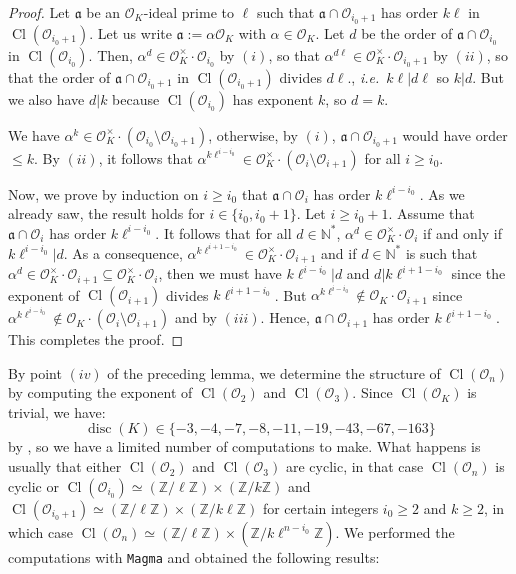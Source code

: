 \documentclass[a4paper,10pt]{report}
\theoremstyle{definition}
\theoremstyle{plain}
\theoremstyle{definition}
\newcommand{\ie}{\emph{i.e.}\ }
\newcommand{\N}{\mathbb{N}}
\newcommand{\Z}{\mathbb{Z}}
\newcommand{\mO}{\mathcal{O}}
\renewcommand{\(}{\left(}
\renewcommand{\)}{\right)}
\newcommand{\mf}[1]{\mathfrak{#1}}
\DeclareMathOperator{\disc}{disc}
\DeclareMathOperator{\Cl}{Cl}
\begin{document}
\begin{proof}
Let $\mf{a}$ be an $\mO_K$-ideal prime to $\ell$ such that $\mf{a}\cap\mO_{i_0+1}$ has order $k\ell$ in $\Cl(\mO_{i_0+1})$.  Let us write $\mf{a}:=\alpha\mO_K$ with $\alpha\in\mO_K$. Let $d$ be the order of $\mf{a}\cap\mO_{i_0}$ in $\Cl(\mO_{i_0})$. Then, $\alpha^{d}\in\mO_K^\times\cdot\mO_{i_0}$ by $(i)$, so that $\alpha^{d\ell}\in\mO_K^\times\cdot\mO_{i_0+1}$ by $(ii)$, so that the order of $\mf{a}\cap\mO_{i_0+1}$ in $\Cl(\mO_{i_0+1})$ divides $d\ell$., \ie $k\ell|d\ell$ so $k|d$. But we also have $d|k$ because $\Cl(\mO_{i_0})$ has exponent $k$, so $d=k$. 

We have $\alpha^k\in\mO_K^\times\cdot(\mO_{i_0}\setminus\mO_{i_0+1})$, otherwise, by $(i)$, $\mf{a}\cap\mO_{i_0+1}$ would have order $\leq k$. By $(ii)$, it follows that $\alpha^{k\ell^{i-i_0}}\in\mO_K^\times\cdot(\mO_{i}\setminus\mO_{i+1})$ for all $i\geq i_0$.

Now, we prove by induction on $i\geq i_0$ that $\mf{a}\cap\mO_i$ has order $k\ell^{i-i_0}$. As we already saw, the result holds for $i\in\{i_0,i_0+1\}$. Let $i\geq i_0+1$. Assume that $\mf{a}\cap\mO_i$ has order $k\ell^{i-i_0}$. It follows that for all $d\in\N^*$, $\alpha^d\in\mO_K^\times\cdot \mO_i$ if and only if $k\ell^{i-i_0}|d$.  As a consequence, $\alpha^{k\ell^{i+1-i_0}}\in\mO_K^\times\cdot \mO_{i+1}$ and if $d\in\N^*$ is such that $\alpha^{d}\in\mO_K^\times\cdot \mO_{i+1}\subseteq \mO_K^\times\cdot \mO_{i}$, then we must have $k\ell^{i-i_0}|d$ and $d|k\ell^{i+1-i_0}$ since the exponent of $\Cl(\mO_{i+1})$ divides $k\ell^{i+1-i_0}$. But $\alpha^{k\ell^{i-i_0}}\not\in\mO_K\cdot\mO_{i+1}$ since $\alpha^{k\ell^{i-i_0}}\not\in\mO_K\cdot(\mO_i\setminus\mO_{i+1})$ and by $(iii)$. Hence, $\mf{a}\cap\mO_{i+1}$ has order $k\ell^{i+1-i_0}$. This completes the proof.

\end{proof}

By point $(iv)$ of the preceding lemma, we determine the structure of $\Cl(\mO_n)$ by computing the exponent of $\Cl(\mO_2)$ and $\Cl(\mO_3)$. Since $\Cl(\mO_K)$ is trivial, we have:
\[\disc(K)\in\{-3,-4,-7,-8,-11,-19,-43,-67,-163\}\]
by \cite[theorem 7.30.(i)]{Cox}, so we have a limited number of computations to make. What happens is usually that either $\Cl(\mO_{2})$ and $\Cl(\mO_{3})$ are cyclic, in that case $\Cl(\mO_n)$ is cyclic or $\Cl(\mO_{i_0})\simeq(\Z/\ell\Z)\times(\Z/k\Z)$ and $\Cl(\mO_{i_0+1})\simeq(\Z/\ell\Z)\times(\Z/k\ell\Z)$ for certain integers $i_0\geq 2$ and $k\geq 2$, in which case $\Cl(\mO_n)\simeq(\Z/\ell\Z)\times(\Z/k\ell^{n-i_0}\Z)$.  We performed the computations with \verb?Magma? \cite{Magma} and obtained the following results:
\end{document}
